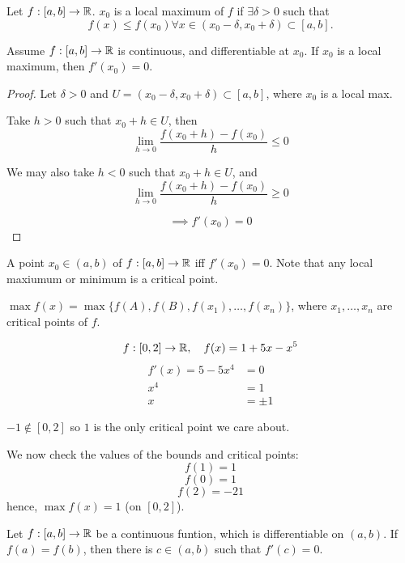 \documentclass[a4paper,10pt]{article}
\begin{document}
\begin{defn}
	Let $f:[a,b] \to \mathbb{R}$. $x_0$ is a local maximum of $f$ if $\exists \delta > 0$ such that
	\[ f(x) \leq f(x_0) \forall x \in (x_0 - \delta, x_0 + \delta) \subset [a,b]. \]
\end{defn}

\begin{thm}[Fermat]
	Assume $f:[a,b] \to \mathbb{R}$ is continuous, and differentiable at
	$x_0$. If $x_0$ is a local maximum, then $f'(x_0) = 0$.
\end{thm}

\begin{proof}
	Let $\delta > 0$ and $U = (x_0 - \delta, x_0 + \delta) \subset [a,b]$, where $x_0$ is a local max.

	Take $h > 0$ such that $x_0 + h \in U$, then
	\[
		\lim_{h \to 0} \frac{f(x_0 + h) - f(x_0)}{h} \leq 0
	\]

	We may also take $h < 0$ such that $x_0 + h \in U$, and
	\[
		\lim_{h \to 0} \frac{f(x_0 + h) - f(x_0)}{h} \geq 0
	\]

	\[ \implies f'(x_0) = 0 \]
\end{proof}

\begin{defn}
	A point $x_0 \in (a,b)$ of $f:[a,b] \to \mathbb{R}$ iff $f'(x_0) = 0$.
	Note that any local maxiumum or minimum is a critical point.
\end{defn}

\begin{cor}
	$\max f(x) = \max \{ f(A), f(B), f(x_1), \ldots, f(x_n) \}$, where
	$x_1, \ldots, x_n$ are critical points of $f$.
\end{cor}

\begin{ex}
	\[ f:[0,2] \to \mathbb{R}, \quad f(x) = 1 + 5x - x^5 \]
	\begin{align*}
		f'(x) = 5 - 5x^4 &= 0 \\
		x^4 &= 1 \\
		x &= \pm 1
	\end{align*}

	$-1 \not \in [0,2]$ so $1$ is the only critical point we care about.

	We now check the values of the bounds and critical points:
	\[ f(1) = 1 \]
	\[ f(0) = 1 \]
	\[ f(2) = -21 \]
	hence, $\max f(x) = 1$ (on $[0,2]$).
\end{ex}

\begin{thm}
	Let $f:[a,b] \to \mathbb{R}$ be a continuous funtion, which is
	differentiable on $(a,b)$. If $f(a) = f(b)$, then there is $c
	\in (a,b)$ such that $f'(c) = 0$.
\end{thm}
\end{document}
